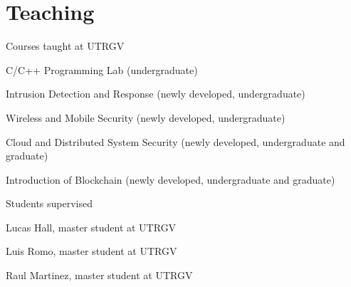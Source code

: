 
\section*{Teaching}
\begin{compactitem}
    \item Courses taught at UTRGV
        \begin{compactitem}
            \item C/C++ Programming Lab (undergraduate)
            \item Intrusion Detection and Response (newly developed, undergraduate)
            \item Wireless and Mobile Security (newly developed, undergraduate)
            \item Cloud and Distributed System Security (newly developed, undergraduate and graduate)
            \item Introduction of Blockchain (newly developed, undergraduate and graduate)
        \end{compactitem}
    \item Students supervised
        \begin{compactitem}
            \item Lucas Hall, master student at UTRGV
            \item Luis Romo, master student at UTRGV
            \item Raul Martinez, master student at UTRGV
        \end{compactitem}   
\end{compactitem}

